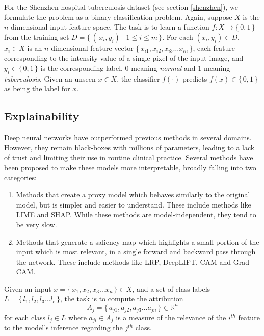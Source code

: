 \documentclass[12pt,oneside,a4paper]{report}
\begin{document}
For the Shenzhen hospital tuberculosis dataset\cite{jaeger2014two} (see section
\ref{shenzhen}), we formulate the problem as a binary classification problem.
Again, suppose $X$ is the $n$-dimensional input feature space. The task is to
learn a function $f:X \rightarrow \{\,0, 1 \,\}$ from the training set $D =
\{\,(\,x_i, y_i) \mid 1 \leq i \leq m\,\}$. For each $(x_i, y_i) \in D$, $x_i
\in X$ is an $n$-dimensional feature vector $\{\,x_{i1}, x_{i2}, x_{i3} \dots
x_{in}\,\}$, each feature corresponding to the intensity value of a single pixel
of the input image, and $y_i \in \{\,0, 1\,\}$ is the corresponding label, $0$
meaning \emph{normal} and $1$ meaning \emph{tuberculosis}. Given an unseen $x
\in X$, the classifier
$f(\cdot)$ predicts $f(x) \in \{\,0, 1\,\}$ as being the label for $x$.\\

\subsection{Explainability}
Deep neural networks have outperformed previous methods in several domains.
However, they remain black-boxes with millions of parameters, leading to a lack
of trust and limiting their use in routine clinical practice. Several methods
have been proposed to make these models more interpretable, broadly falling into
two categories:
\begin{enumerate}
\item{Methods that create a proxy model which behaves similarly to the original
    model, but is simpler and easier to understand. These include methods like
    LIME\cite{ribeiro2016should} and SHAP\cite{NIPS2017_7062}. While these
    methods are model-independent, they tend to be very slow.}
\item{Methods that generate a saliency map which highlights a small portion of
    the input which is most relevant, in a single forward and backward pass
    through the network. These include methods like LRP\cite{bach2015pixel},
    DeepLIFT\cite{shrikumar2017learning}, CAM\cite{zhou2016learning} and
    Grad-CAM\cite{selvaraju2017grad}.}
\end{enumerate}
Given an input $x = \{\, x_{1}, x_{2}, x_{3} \dots x_{n} \,\} \in X$, and a set
of class labels $L = \{\,l_1 ,l_2 ,l_3 \dots l_c\,\}$, the task is to compute
the attribution
\begin{equation}
  A_j = \{\,a_{j1}, a_{j2}, a_{j3} \dots a_{jn}\,\} \in \mathbb{R} ^n
\end{equation}
for each class $l_j \in L$ where $a_{ji} \in A_j$ is a measure of the relevance
of
the $i^{th}$ feature to the model's inference regarding the $j^{th}$ class.\\
\end{document}
